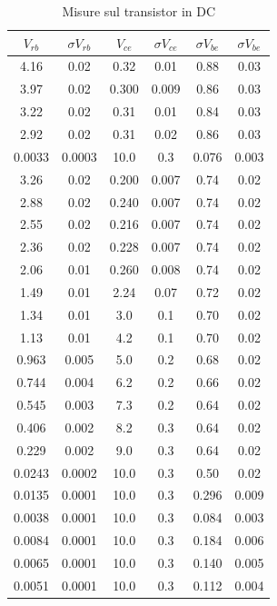 \documentclass[10pt,a4paper]{article}
\begin{document}
\begin{table}[!htb]\centering
\begin{tabular}{|c|c|c|c|c|c|}
\hline
$V_{rb}$ & $\sigma V_{rb}$ & $V_{ce}$ & $\sigma V_{ce}$ & $\sigma V_{be}$ & $\sigma V_{be}$\\
\hline
4.16 & 0.02 & 0.32 & 0.01 & 0.88 & 0.03\\
3.97 & 0.02 & 0.300 & 0.009 & 0.86 & 0.03\\
3.22 & 0.02 & 0.31 & 0.01 & 0.84 & 0.03\\
2.92 & 0.02 & 0.31 & 0.02 & 0.86 & 0.03\\
0.0033 & 0.0003 & 10.0 & 0.3 & 0.076 & 0.003\\
3.26 & 0.02 & 0.200 & 0.007 & 0.74 & 0.02\\
2.88 & 0.02 & 0.240 & 0.007 & 0.74 & 0.02\\
2.55 & 0.02 & 0.216 & 0.007 & 0.74 & 0.02\\
2.36 & 0.02 & 0.228 & 0.007 & 0.74 & 0.02\\
2.06 & 0.01 & 0.260 & 0.008 & 0.74 & 0.02\\
1.49 & 0.01 & 2.24 & 0.07 & 0.72 & 0.02\\
1.34 & 0.01 & 3.0 & 0.1 & 0.70 & 0.02\\
1.13 & 0.01 & 4.2 & 0.1 & 0.70 & 0.02\\
0.963 & 0.005 & 5.0 & 0.2 & 0.68 & 0.02\\
0.744 & 0.004 & 6.2 & 0.2 & 0.66 & 0.02\\
0.545 & 0.003 & 7.3 & 0.2 & 0.64 & 0.02\\
0.406 & 0.002 & 8.2 & 0.3 & 0.64 & 0.02\\
0.229 & 0.002 & 9.0 & 0.3 & 0.64 & 0.02\\
0.0243 & 0.0002 & 10.0 & 0.3 & 0.50 & 0.02\\
0.0135 & 0.0001 & 10.0 & 0.3 & 0.296 & 0.009\\
0.0038 & 0.0001 & 10.0 & 0.3 & 0.084 & 0.003\\
0.0084 & 0.0001 & 10.0 & 0.3 & 0.184 & 0.006\\
0.0065 & 0.0001 & 10.0 & 0.3 & 0.140 & 0.005\\
0.0051 & 0.0001 & 10.0 & 0.3 & 0.112 & 0.004\\
\hline
\end{tabular}
\caption{Misure sul transistor in DC} \label{misureDC}
\end{table}
\end{document}
